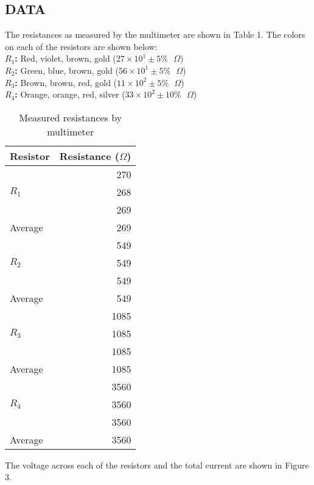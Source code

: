 \documentclass [12pt, letterpaper, twoside] {article}
\begin{document}
\subsection* {DATA}
The resistances as measured by the multimeter are shown in Table 1. The colors on each of the resistors are shown below: \\

\indent
\textbf{\(R_{1}\):} Red, violet, brown, gold (\(27\times10^{1}\pm5\%\text{ }\Omega\)) \\
\indent
\textbf{\(R_{2}\):} Green, blue, brown, gold (\(56\times10^{1}\pm5\%\text{ }\Omega\)) \\
\indent
\textbf{\(R_{3}\):} Brown, brown, red, gold (\(11\times10^{2}\pm5\%\text{ }\Omega\)) \\
\indent
\textbf{\(R_{4}\):} Orange, orange, red, silver (\(33\times10^{2}\pm10\%\text{ }\Omega\)) \\

\begin{table}[h!]
  \centering
  \begin{tabular}{| l | r |}
    \hline\hline
    Resistor & Resistance (\(\Omega\)) \\
    \hline
    \multirow {3}{*}{\(R_{1}\)} & 270 \\
    & 268 \\
    & 269 \\
    \hline
    Average & 269 \\
    \hline
    \multirow {3}{*}{\(R_{2}\)} & 549 \\
    & 549 \\
    & 549 \\
    \hline
    Average & 549 \\
    \hline
    \multirow {3}{*}{\(R_{3}\)} & 1085 \\
    & 1085 \\
    & 1085 \\
    \hline
    Average & 1085 \\
    \hline
    \multirow {3}{*}{\(R_{4}\)} & 3560 \\
    & 3560 \\
    & 3560 \\
    \hline
    Average & 3560 \\
    \hline\hline
  \end{tabular}
  \caption{Measured resistances by multimeter}
\end{table}


\noindent
The voltage across each of the resistors and the total current are shown in Figure 3.
\end{document}
